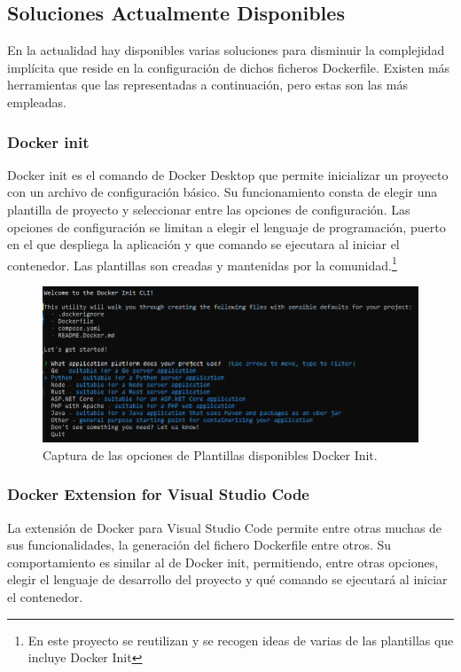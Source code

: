 \documentclass[12pt, a4paper, twoside]{article}
\begin{document}
\subsection{Soluciones Actualmente Disponibles}
En la actualidad hay disponibles varias soluciones para disminuir la complejidad implícita que reside en la configuración de dichos ficheros Dockerfile. Existen más herramientas que las representadas a continuación, pero estas son las más empleadas.
\subsubsection{Docker init}
Docker init es el comando de Docker Desktop \cite{docker_desktop} que permite inicializar un proyecto con un archivo de configuración básico.
Su funcionamiento consta de elegir una plantilla de proyecto y seleccionar entre las opciones de configuración.
Las opciones de configuración se limitan a elegir el lenguaje de programación, puerto en el que despliega la aplicación y que comando se ejecutara al iniciar el contenedor.
Las plantillas son creadas y mantenidas por la comunidad.\footnote{En este proyecto se reutilizan y se recogen ideas de varias de las plantillas que incluye Docker Init}
\begin{figure}[ht]
  \centering
    \includegraphics[width=1\textwidth]{Docker Init.png}
  \caption{Captura de las opciones de Plantillas disponibles Docker Init.}
\end{figure}

\newpage
\subsubsection{Docker Extension for Visual Studio Code}
La extensión de Docker para Visual Studio Code \cite{vscode_containers_overview} permite entre otras muchas de sus funcionalidades, la generación del fichero Dockerfile entre otros.
Su comportamiento es similar al de Docker init, permitiendo, entre otras opciones, elegir el lenguaje de desarrollo del proyecto y qué comando se ejecutará al iniciar el contenedor.
\end{document}
